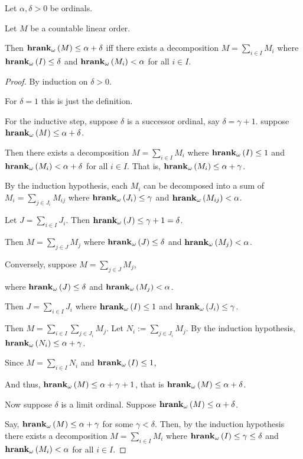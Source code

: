 \begin{lemma}
  Let $\alpha, \delta > 0$ be ordinals.

  Let $M$ be a countable linear order.

  Then $\mathbf{hrank}_{\omega}\left( M \right) \le \alpha + \delta$ iff there exists a decomposition
  $M = \sum_{i \in I} M_i$ where $\mathbf{hrank}_{\omega}\left( I \right) \le \delta$ and $\mathbf{hrank}_{\omega}\left( M_i \right) < \alpha$ for all $i \in I$.
\end{lemma}

\begin{proof}
  By induction on $\delta > 0$.

  For $\delta = 1$ this is just the definition.

  For the inductive step,
  suppose $\delta$ is a successor ordinal, say $\delta = \gamma + 1$.
  suppose $\mathbf{hrank}_{\omega}\left( M \right) \le \alpha + \delta$.

  Then there exists a decomposition $M = \sum_{i \in I} M_i$ where $\mathbf{hrank}_{\omega}\left( I \right) \le 1$
  and $\mathbf{hrank}_{\omega}\left( M_i \right) < \alpha + \delta$ for all $i \in I$.
  That is, $\mathbf{hrank}_{\omega}\left( M_i \right) \le \alpha + \gamma$.

  By the induction hypothesis, each $M_i$ can be decomposed into a sum of
  $M_i = \sum_{j \in J_i} M_{ij}$
  where $\mathbf{hrank}_{\omega}\left( J_i \right) \le \gamma$ and $\mathbf{hrank}_{\omega}\left( M_{ij} \right) < \alpha$.
  
  Let $J = \sum_{i \in I} J_i$. Then $\mathbf{hrank}_{\omega}\left( J \right) \le \gamma + 1 = \delta$.

  Then $M = \sum_{j \in J} M_j$ where $\mathbf{hrank}_{\omega}\left( J \right) \le \delta$ and $\mathbf{hrank}_{\omega}\left( M_j \right) < \alpha$.

  Conversely, suppose $M = \sum_{j \in J} M_j$,

  where $\mathbf{hrank}_{\omega}\left( J \right) \le \delta$ and $\mathbf{hrank}_{\omega}\left( M_j \right) < \alpha$.
  
  Then $J = \sum_{i \in I} J_i$ where $\mathbf{hrank}_{\omega}\left( I \right) \le 1$ and $\mathbf{hrank}_{\omega}\left( J_i \right) \le \gamma$.
  
  Then $M = \sum_{i \in I} \sum_{j \in J_i} M_j$.
  Let $N_i := \sum_{j \in J_i} M_j$. By the induction hypothesis,
  $\mathbf{hrank}_{\omega}\left( N_i \right) \le \alpha + \gamma$.

  Since $M = \sum_{i \in I} N_i$ and $\mathbf{hrank}_{\omega}\left( I \right) \le 1$,
  
  And thus, $\mathbf{hrank}_{\omega}\left( M \right) \le \alpha + \gamma + 1$,
  that is $\mathbf{hrank}_{\omega}\left( M \right) \le \alpha + \delta$.

  Now suppose $\delta$ is a limit ordinal.
  Suppose $\mathbf{hrank}_{\omega}\left( M \right) \le \alpha + \delta$.

  Say, $\mathbf{hrank}_{\omega}\left( M \right) \le \alpha + \gamma$ for some $\gamma < \delta$.
  Then, by the induction hypothesis there exists a decomposition
  $M = \sum_{i \in I} M_i$ where $\mathbf{hrank}_{\omega}\left( I \right) \le \gamma \le \delta$
  and $\mathbf{hrank}_{\omega}\left( M_i \right) < \alpha$ for all $i \in I$.


\end{proof}
